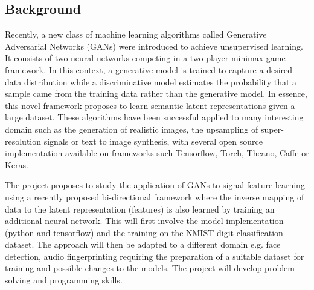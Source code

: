 \documentclass[]{monthly-report}
\begin{document}
\subsection{Background}

Recently, a new class of machine learning algorithms called Generative Adversarial Networks (GANs) were introduced to achieve unsupervised learning. It consists of two neural networks competing in a two-player minimax game framework. In this context, a generative model is trained to capture a desired data distribution while a discriminative model estimates the probability that a sample came from the training data rather than the generative model. In essence, this novel framework proposes to learn semantic latent representations given a large dataset. These algorithms have been successful applied to many interesting domain such as the generation of realistic images, the upsampling of super-resolution signals or text to image synthesis, with several open source implementation available on frameworks such Tensorflow, Torch, Theano, Caffe or Keras.

The project proposes to study the application of GANs to signal feature learning using a recently proposed bi-directional framework where the inverse mapping of data to the latent representation (features) is also learned by training an additional neural network. This will first involve the model implementation (python and tensorflow) and the training on the NMIST digit classification dataset.  The approach will then be adapted to a different domain e.g. face detection, audio fingerprinting requiring the preparation of a suitable dataset for training and possible changes to the models. The project will develop problem solving and programming skills.



\begingroup
\raggedright
{}
\endgroup



\label{last_page}

 
\end{document}

